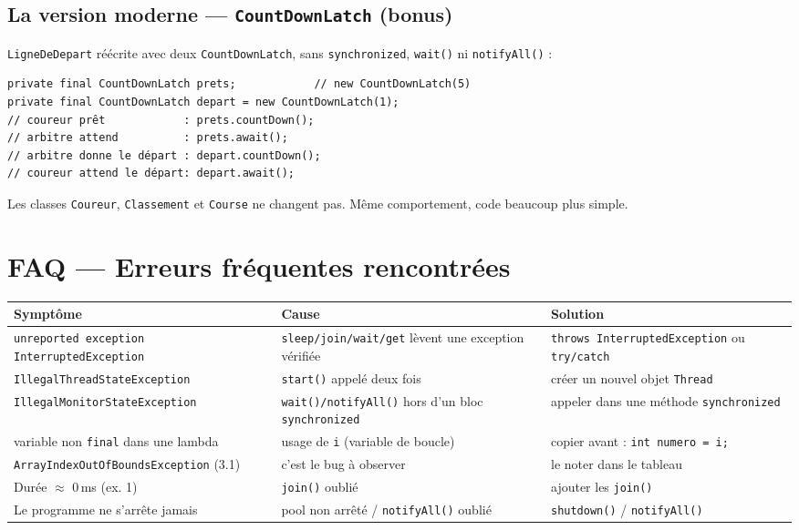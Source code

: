 \documentclass[11pt,a4paper]{article}
\begin{document}
\subsection{La version moderne — \texttt{CountDownLatch} (bonus)}
\texttt{LigneDeDepart} réécrite avec deux \texttt{CountDownLatch}, sans
\texttt{synchronized}, \texttt{wait()} ni \texttt{notifyAll()} :
\begin{lstlisting}
private final CountDownLatch prets;            // new CountDownLatch(5)
private final CountDownLatch depart = new CountDownLatch(1);
// coureur prêt            : prets.countDown();
// arbitre attend          : prets.await();
// arbitre donne le départ : depart.countDown();
// coureur attend le départ: depart.await();
\end{lstlisting}
Les classes \texttt{Coureur}, \texttt{Classement} et \texttt{Course} ne changent pas.
Même comportement, code beaucoup plus simple.

\section{FAQ — Erreurs fréquentes rencontrées}
\begin{table}[H]\centering\small
\renewcommand{\arraystretch}{1.3}
\begin{tabular}{p{4.6cm}p{4.3cm}p{4.3cm}}
\toprule
\textbf{Symptôme} & \textbf{Cause} & \textbf{Solution} \\
\midrule
\texttt{unreported exception InterruptedException} & \texttt{sleep/join/wait/get} lèvent une exception vérifiée & \texttt{throws InterruptedException} ou \texttt{try/catch} \\
\texttt{IllegalThreadStateException} & \texttt{start()} appelé deux fois & créer un nouvel objet \texttt{Thread} \\
\texttt{IllegalMonitorStateException} & \texttt{wait()/notifyAll()} hors d'un bloc \texttt{synchronized} & appeler dans une méthode \texttt{synchronized} \\
variable non \texttt{final} dans une lambda & usage de \texttt{i} (variable de boucle) & copier avant : \texttt{int numero = i;} \\
\texttt{ArrayIndexOutOfBoundsException} (3.1) & c'est le bug à observer & le noter dans le tableau \\
Durée $\approx$ 0\,ms (ex. 1) & \texttt{join()} oublié & ajouter les \texttt{join()} \\
Le programme ne s'arrête jamais & pool non arrêté / \texttt{notifyAll()} oublié & \texttt{shutdown()} / \texttt{notifyAll()} \\
\bottomrule
\end{tabular}
\end{table}
\end{document}
